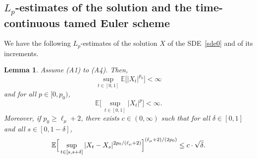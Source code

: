\documentclass[11pt]{amsart}
\newcommand{\EE}{{\mathbb E}}
\theoremstyle{plain}
\newtheorem{lemma}{Lemma}
\theoremstyle{definition}
\begin{document}
\subsection{$L_p$-estimates of the solution  and the time-continuous tamed Euler scheme}\label{4.1}
We have the following $L_p$-estimates  of the solution $X$ of the SDE~\eqref{sde0} and of its increments.
\begin{lemma}\label{solprop}
Assume (A1) to (A4). Then,
\begin{equation}\label{tmg02}
\sup_{t\in[0,1]}\EE\bigl[|X_t|^{p_0}\bigr] < \infty
\end{equation}
and for all $p\in [0,p_0)$,
\begin{equation}\label{tmg02a}
\EE\bigl[\,\sup_{t\in[0,1]}|X_t|^{p}\bigr] < \infty.
\end{equation}
Moreover, if $p_0 \ge \ell_\mu +2$,  there exists  $c\in(0, \infty)$ such that  for all $\delta\in[0,1]$ and all $s\in[0, 1-\delta]$,
\begin{equation}\label{tmg03}
\EE\Bigl[\,\sup_{t\in[s, s+\delta]} |X_t-X_s|^{2p_0/(\ell_\mu+2)}\Bigr]^{(\ell_\mu+2)/(2p_0)}\leq c\cdot \sqrt{\delta}.
\end{equation}
\end{lemma}
\end{document}

